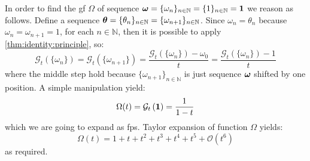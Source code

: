 In order to find the \ac{gf} $\Omega$ of sequence
$\boldsymbol{\omega}=\lbrace\omega_{n}\rbrace_{n\in\mathbb{N}}
=\lbrace1\rbrace_{n\in\mathbb{N}}=\boldsymbol{1}$ we reason as follows.  Define a sequence
$\boldsymbol{\theta}=\lbrace\theta_{n}\rbrace_{n\in\mathbb{N}}=\lbrace\omega_{n+1}\rbrace_{n\in\mathbb{N}}$.
Since $\omega_{n}=\theta_{n}$ because $\omega_{n}=\omega_{n+1}=1$, for each
$n\in\mathbb{N}$, then it is possible to apply
\autoref{thm:identity:principle}, so:
\begin{displaymath}
    \mathcal{G}_{t}\left(\lbrace\omega_{n}\rbrace\right) 
        =\mathcal{G}_{t}\left(\lbrace\omega_{n+1}\rbrace\right)
        =\frac{\mathcal{G}_{t}\left(\lbrace\omega_{n}\rbrace\right)-\omega_{0}}{t}
        =\frac{\mathcal{G}_{t}\left(\lbrace\omega_{n}\rbrace\right)-1}{t}
\end{displaymath}
where the middle step hold because $\lbrace\omega_{n+1}\rbrace_{n\in\mathbb{N}}$ is
just sequence $\boldsymbol{\omega}$ shifted by one position. A simple manipulation yield:
\begin{equation}
    \Omega(t)=\mathcal{G}_{t}\left(\boldsymbol{1}\right) =\frac{1}{1-t}
    \label{eq:1:gf}
\end{equation}
which we are going to expand as \ac{fps}. Taylor expansion of function $\Omega$
yields:
\begin{displaymath}
    \Omega(t)=1+t+t^{2}+t^{3}+t^{4}+t^{5}+\mathcal{O}(t^{6})
\end{displaymath}
as required.

